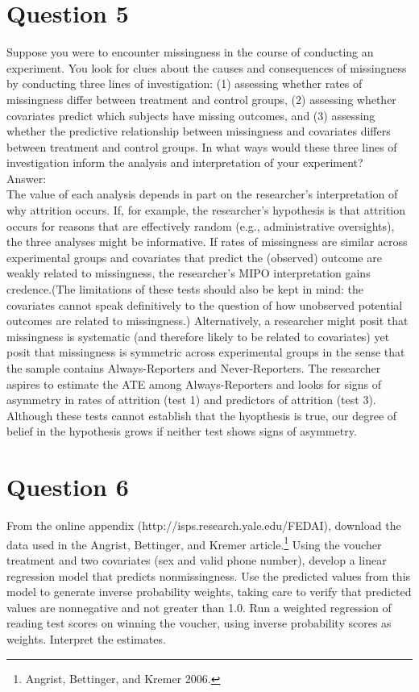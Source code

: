 \documentclass[11pt,notitlepage]{article}\usepackage[]{graphicx}\usepackage[]{color}
\begin{document}
\section*{Question 5}
Suppose you were to encounter missingness in the course of conducting an experiment. You look for clues about the causes and consequences of missingness by conducting three lines of investigation: (1) assessing whether rates of missingness differ between treatment and control groups, (2) assessing whether covariates predict which subjects have missing outcomes, and (3) assessing whether the predictive relationship between missingness and covariates differs between treatment and control groups. In what ways would these three lines of investigation inform the analysis and interpretation of your experiment?\\
Answer:\\
The value of each analysis depends in part on the researcher's interpretation of why attrition occurs. If, for example, the researcher's hypothesis is that attrition occurs for reasons that are effectively random (e.g., administrative oversights), the three analyses might be informative.  If rates of missingness are similar across experimental groups and covariates that predict the (observed) outcome are weakly related to missingness, the researcher's MIPO interpretation gains credence.(The limitations of these tests should also be kept in mind: the covariates cannot speak definitively to the question of how unobserved potential outcomes are related to missingness.)  Alternatively, a researcher might posit that missingness is systematic (and therefore likely to be related to covariates) yet posit that missingness is symmetric across experimental groups in the sense that the sample contains Always-Reporters and Never-Reporters. The researcher aspires to estimate the ATE among Always-Reporters and looks for signs of asymmetry in rates of attrition (test 1) and predictors of attrition (test 3). Although these tests cannot establish that the hyopthesis is true, our degree of belief in the hypothesis grows if neither test shows signs of asymmetry.
\section*{Question 6}
From the online appendix (http://isps.research.yale.edu/FEDAI), download the data used in the Angrist, Bettinger, and Kremer article.\footnote{Angrist, Bettinger, and Kremer 2006.} Using the voucher treatment and two covariates (sex and valid phone number), develop a linear regression model that predicts nonmissingness. Use the predicted values from this model to generate inverse probability weights, taking care to verify that predicted values are nonnegative and not greater than 1.0. Run a weighted regression of reading test scores on winning the voucher, using inverse probability scores as weights. Interpret the estimates.
\end{document}

